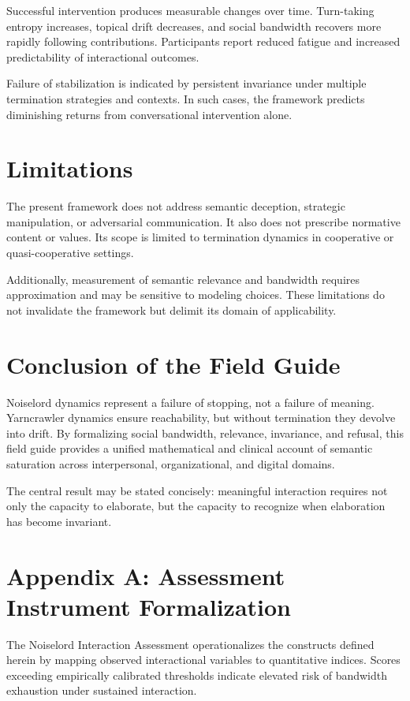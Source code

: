 \documentclass[12pt]{article}
\theoremstyle{remark}
\begin{document}
Successful intervention produces measurable changes over time. Turn-taking entropy increases, topical drift decreases, and social bandwidth recovers more rapidly following contributions. Participants report reduced fatigue and increased predictability of interactional outcomes.

Failure of stabilization is indicated by persistent invariance under multiple termination strategies and contexts. In such cases, the framework predicts diminishing returns from conversational intervention alone.

\section{Limitations}

The present framework does not address semantic deception, strategic manipulation, or adversarial communication. It also does not prescribe normative content or values. Its scope is limited to termination dynamics in cooperative or quasi-cooperative settings.

Additionally, measurement of semantic relevance and bandwidth requires approximation and may be sensitive to modeling choices. These limitations do not invalidate the framework but delimit its domain of applicability.

\section{Conclusion of the Field Guide}

Noiselord dynamics represent a failure of stopping, not a failure of meaning. Yarncrawler dynamics ensure reachability, but without termination they devolve into drift. By formalizing social bandwidth, relevance, invariance, and refusal, this field guide provides a unified mathematical and clinical account of semantic saturation across interpersonal, organizational, and digital domains.

The central result may be stated concisely: meaningful interaction requires not only the capacity to elaborate, but the capacity to recognize when elaboration has become invariant.

\appendix

\section{Appendix A: Assessment Instrument Formalization}

The Noiselord Interaction Assessment operationalizes the constructs defined herein by mapping observed interactional variables to quantitative indices. Scores exceeding empirically calibrated thresholds indicate elevated risk of bandwidth exhaustion under sustained interaction.
\end{document}
